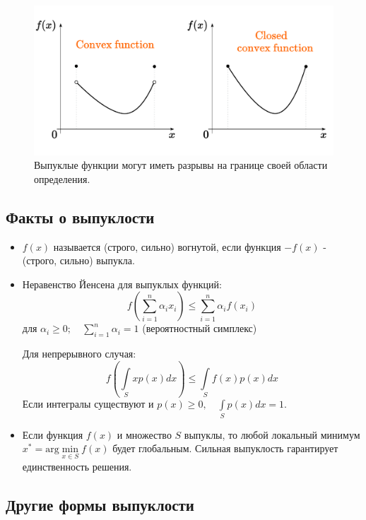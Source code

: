 \documentclass[
  russian,
  letterpaper,
  DIV=11,
  numbers=noendperiod]{scrartcl}
\begin{document}
\begin{figure}[H]

{\centering \includegraphics[width=0.88\linewidth,height=\textheight,keepaspectratio]{closed_function.pdf}

}

\caption{Выпуклые функции могут иметь разрывы на границе своей области
определения.}

\end{figure}%

\subsection{Факты о
выпуклости}\label{ux444ux430ux43aux442ux44b-ux43e-ux432ux44bux43fux443ux43aux43bux43eux441ux442ux438}

\begin{itemize}
\item
  \(f(x)\) называется (строго, сильно) вогнутой, если функция \(-f(x)\)
  - (строго, сильно) выпукла.
\item
  Неравенство Йенсена для выпуклых функций: \[
   f \left( \sum\limits_{i=1}^n \alpha_i x_i \right) \leq \sum\limits_{i=1}^n \alpha_i f(x_i)
   \] для \(\alpha_i \geq 0; \quad \sum\limits_{i=1}^n \alpha_i = 1\)
  (вероятностный симплекс)

  Для непрерывного случая:\\
  \[
   f \left( \int\limits_{S} x p(x)dx \right) \leq \int\limits_{S} f(x)p(x)dx
   \] Если интегралы существуют и
  \(p(x) \geq 0, \quad \int\limits_{S} p(x)dx = 1\).
\item
  Если функция \(f(x)\) и множество \(S\) выпуклы, то любой локальный
  минимум \(x^* = \text{arg}\min\limits_{x \in S} f(x)\) будет
  глобальным. Сильная выпуклость гарантирует единственность решения.
\end{itemize}

\subsection{Другие формы
выпуклости}\label{ux434ux440ux443ux433ux438ux435-ux444ux43eux440ux43cux44b-ux432ux44bux43fux443ux43aux43bux43eux441ux442ux438}
\end{document}

